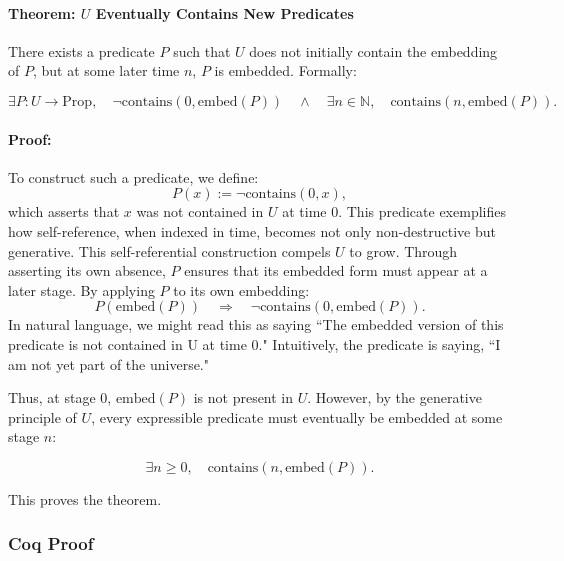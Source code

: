 \documentclass[12pt]{article}
\begin{document}
\paragraph{Theorem: \( U \) Eventually Contains New Predicates}
There exists a predicate \( P \) such that \( U \) does not initially contain the embedding of \( P \), but at some later time \( n \), \( P \) is embedded. Formally:

\begin{equation}
    \exists P: U \to \text{Prop}, \quad 
    \neg \text{contains}(0, \text{embed}(P)) \quad \wedge \quad 
    \exists n \in \mathbb{N}, \quad \text{contains}(n, \text{embed}(P)).
\end{equation}

\paragraph{Proof:}
To construct such a predicate, we define:
\begin{equation}
    P(x) := \neg \text{contains}(0, x),
\end{equation}
which asserts that \( x \) was not contained in $U$ at time \( 0 \). This predicate exemplifies how self-reference, when indexed in time, becomes not only non-destructive but generative. This self-referential construction compels \( U \) to grow. Through asserting its own absence, $P$ ensures that its embedded form must appear at a later stage. By applying \( P \) to its own embedding:
\begin{equation}
    P(\text{embed}(P)) \quad \Rightarrow \quad \neg \text{contains}(0, \text{embed}(P)).
\end{equation}
In natural language, we might read this as saying ``The embedded version of this predicate is not contained in U at time 0." Intuitively, the predicate is saying, ``I am not yet part of the universe."

Thus, at stage \( 0 \), \( \text{embed}(P) \) is not present in \( U \). However, by the generative principle of \( U \), every expressible predicate must eventually be embedded at some stage \( n \):

\begin{equation}
    \exists n \geq 0, \quad \text{contains}(n, \text{embed}(P)).
\end{equation}

This proves the theorem.

\subsubsection{Coq Proof}
\end{document}
